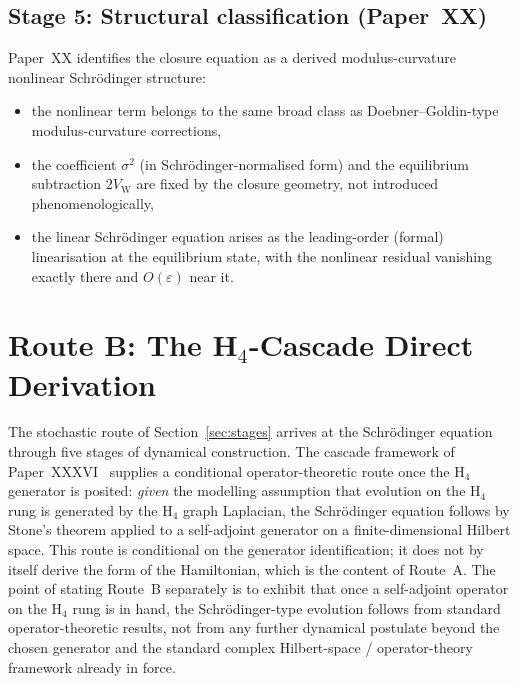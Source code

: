 \documentclass[12pt]{article}
\newcommand{\VW}{V_{\mathrm{W}}}
\begin{document}
\subsection{Stage 5: Structural classification (Paper~XX)}

Paper~XX identifies the closure equation as a derived modulus-curvature nonlinear Schr\"odinger structure:
\begin{itemize}
    \item the nonlinear term belongs to the same broad class as Doebner--Goldin-type modulus-curvature corrections,
    \item the coefficient $\sigma^2$ (in Schr\"odinger-normalised form) and the equilibrium subtraction $2\VW$ are fixed by the closure geometry, not introduced phenomenologically,
    \item the linear Schr\"odinger equation arises as the leading-order (formal) linearisation at the equilibrium state, with the nonlinear residual vanishing exactly there and $O(\varepsilon)$ near it.
\end{itemize}

\section{Route B: The H${}_4$-Cascade Direct Derivation}\label{sec:route_b}

The stochastic route of Section~\ref{sec:stages} arrives at the Schr\"odinger equation through five stages of dynamical construction. The cascade framework of Paper~XXXVI~\citep{SmartXXXVI} supplies a conditional operator-theoretic route once the H${}_4$ generator is posited: \emph{given} the modelling assumption that evolution on the H${}_4$ rung is generated by the H${}_4$ graph Laplacian, the Schr\"odinger equation follows by Stone's theorem applied to a self-adjoint generator on a finite-dimensional Hilbert space. This route is conditional on the generator identification; it does not by itself derive the form of the Hamiltonian, which is the content of Route~A. The point of stating Route~B separately is to exhibit that once a self-adjoint operator on the H${}_4$ rung is in hand, the Schr\"odinger-type evolution follows from standard operator-theoretic results, not from any further dynamical postulate beyond the chosen generator and the standard complex Hilbert-space / operator-theory framework already in force.
\end{document}
